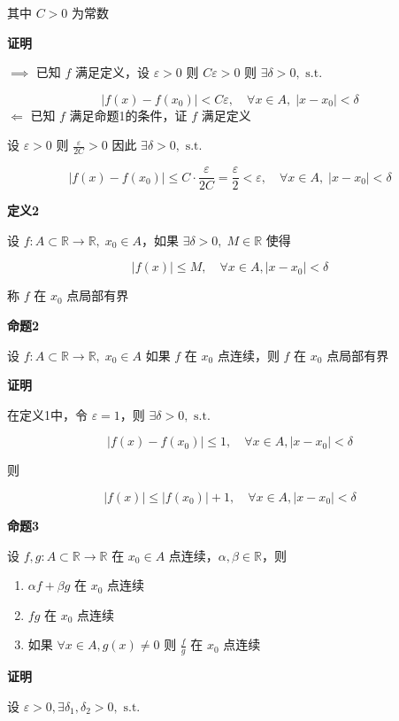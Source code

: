 其中 \(C>0\) 为常数

\textbf{证明}

\(\implies\) 已知 \(f\) 满足定义，设 \(\varepsilon>0\) 则
\(C\varepsilon>0\) 则 \(\exists \delta>0,\text{ s.t.}\)

\[
|f(x)-f(x_{0})|<C\varepsilon, \quad \forall x \in A , \; |x-x_{0}|<\delta
\] \(\Longleftarrow\) 已知 \(f\) 满足命题1的条件，证 \(f\) 满足定义

设 \(\varepsilon>0\) 则 \(\frac{\varepsilon}{2C}>0\) 因此
\(\exists \delta>0,\text{ s.t.}\)

\[
|f(x)-f(x_{0})|\leq C \cdot \frac{\varepsilon}{2C} =\frac{\varepsilon}{2}<\varepsilon , \quad \forall x \in A, \; |x-x_{0}|<\delta
\]

\textbf{定义2}

设 \(f:A\subset \mathbb{R} \to \mathbb{R}, \; x_{0} \in A\)，如果
\(\exists \delta>0, \; M \in \mathbb{R}\) 使得

\[
|f(x)|\leq M, \quad \forall x \in A, |x-x_{0}|<\delta
\]

称 \(f\) 在 \(x_{0}\) 点局部有界

\textbf{命题2}

设 \(f:A\subset \mathbb{R}\to \mathbb{R}, \; x_{0}\in A\) 如果 \(f\) 在
\(x_{0}\) 点连续，则 \(f\) 在 \(x_{0}\) 点局部有界

\textbf{证明}

在定义1中，令 \(\varepsilon=1\)，则 \(\exists \delta >0,\text{ s.t.}\)

\[
|f(x)-f(x_{0})|\leq 1, \quad \forall x \in A,|x-x_{0}|<\delta
\]

则

\[
|f(x)|\leq |f(x_{0})|+1, \quad \forall x \in A, |x-x_{0}|<\delta 
\]

\textbf{命题3}

设 \(f,g:A\subset \mathbb{R} \to \mathbb{R}\) 在 \(x_{0}\in A\)
点连续，\(\alpha,\beta \in \mathbb{R}\)，则

\begin{enumerate}
\def\labelenumi{\arabic{enumi}.}
\tightlist
\item
  \(\alpha f+\beta g\) 在 \(x_{0}\) 点连续
\item
  \(fg\) 在 \(x_{0}\) 点连续
\item
  如果 \(\forall x \in A, g(x)\neq 0\) 则 \(\frac{f}{g}\) 在 \(x_{0}\)
  点连续
\end{enumerate}

\textbf{证明}

设 \(\varepsilon>0, \exists \delta_{1},\delta_{2}>0,\text{ s.t.}\)

